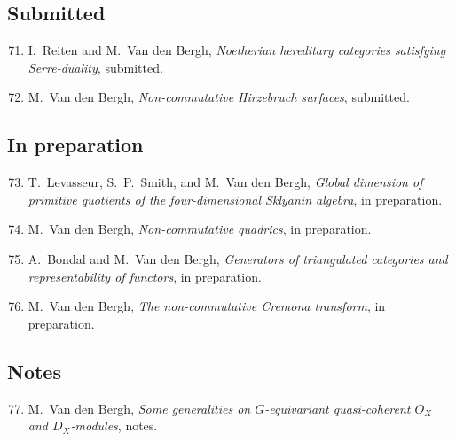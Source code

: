 \subsection*{Submitted}

\begin{enumerate}
\setcounter{enumi}{70}
\item
I.~Reiten and M.~Van den Bergh, {\em Noetherian hereditary categories satisfying Serre-duality}, submitted.

\item
M.~Van den Bergh, {\em Non-commutative Hirzebruch surfaces}, submitted.

\end{enumerate}


\subsection*{In preparation}

\begin{enumerate}
\setcounter{enumi}{72}
\item
T.~Levasseur, S.~P.~Smith, and M.~Van den Bergh, {\em Global dimension of primitive quotients of the four-dimensional Sklyanin algebra}, in preparation.

\item
M.~Van den Bergh, {\em Non-commutative quadrics}, in preparation.

\item
A.~Bondal and M.~Van den Bergh, {\em Generators of triangulated categories and representability of functors}, in preparation.

\item
M.~Van den Bergh, {\em The non-commutative Cremona transform}, in preparation.

\end{enumerate}


\subsection*{Notes}

\begin{enumerate}
\setcounter{enumi}{76}
\item
M.~Van den Bergh, {\em Some generalities on $G$-equivariant quasi-coherent $O_X$ and $D_X$-modules}, notes.

\end{enumerate}

